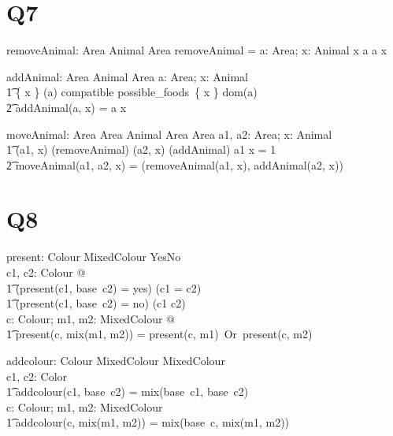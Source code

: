\documentclass{article}
\begin{document}
\section*{Q7}

\begin{axdef} 
	removeAnimal: Area \cross Animal \pfun Area
\where
	removeAnimal = \lambda a: Area; x: Animal \mid x \inbag a \spot a \uminus \lbag x \rbag \\
\end{axdef}


\begin{axdef} 
	addAnimal: Area \cross Animal \pfun Area
\where
	\forall a: Area; x: Animal \mid \\
		\t1 \{ x \} \cross \dom(a) \subseteq compatible \land \bigcap possible\_foods\ \limg \{ x \} \cup dom(a) \rimg \neq \emptyset \spot  \\
		\t2 addAnimal(a, x) = a \uplus \lbag x \rbag
\end{axdef}

	
\begin{axdef} %
	moveAnimal: Area \cross Area \cross Animal \pfun Area \cross Area
\where
\forall a1, a2: Area; x: Animal \mid \\ 
	\t1 (a1, x) \in \dom(removeAnimal) \land (a2, x) \in \dom(addAnimal) \land a1 \bcount x = 1 \spot \\
	\t2 moveAnimal(a1, a2, x) = (removeAnimal(a1, x), addAnimal(a2, x))
\end{axdef}

\section*{Q8}

\begin{axdef}
	present: Colour \cross MixedColour \fun YesNo \\
\where
\forall c1, c2: Colour @ \\
	\t1 (present(c1, base\ c2) = yes) \iff (c1 = c2) \\
	\t1 (present(c1, base\ c2) = no) \iff (c1 \neq c2) \\
\forall c: Colour; m1, m2: MixedColour @ \\
	\t1 present(c, mix(m1, m2)) = present(c, m1)\ Or\ present(c, m2) \\
\end{axdef}

\begin{axdef}
	addcolour: Colour \cross MixedColour \fun MixedColour \\
\where
	\forall c1, c2: Color \\
		\t1 addcolour(c1, base\ c2) = mix(base\ c1, base\ c2) \\
	\forall c: Colour; m1, m2: MixedColour \\
		\t1 addcolour(c, mix(m1, m2)) = mix(base\ c, mix(m1, m2)) \\
 \end{axdef}
\end{document}
